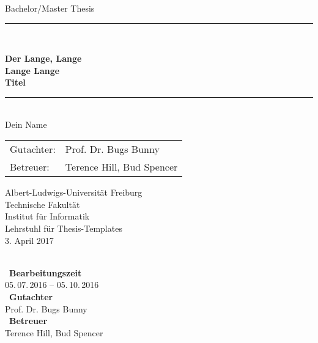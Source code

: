 \begin{titlepage}
\begin{center}

\newcommand{\HorizontalLine}{\rule{\linewidth}{0.3mm}}

{\Large Bachelor/Master Thesis}\\[1.3cm]


\HorizontalLine \\[0.4cm]
\begin{spacing}{3}
    {\huge \bfseries Der Lange, Lange } \\
    {\huge \bfseries Lange Lange} \\
    {\huge \bfseries Titel}\\
\end{spacing}
\HorizontalLine \\[1.5cm]


{\Huge Dein Name} \\[2cm]


\begin{tabular}[hc]{>{\huge}l >{\huge}l}
  Gutachter: & Prof. Dr. Bugs Bunny \\[0.3cm]
  Betreuer: & Terence Hill, Bud Spencer \\[1.2cm]
\end{tabular}
\vfill  %

\Large {
    Albert-Ludwigs-Universität Freiburg\\
    Technische Fakultät\\
    Institut für Informatik\\
    Lehrstuhl für Thesis-Templates\\[1cm]

    3. April 2017
    \\
}
\end{center}
\end{titlepage}

\ \vfill \ \\  %
\
\textbf{Bearbeitungszeit}            \smallskip{} \\
05.\,07.\,2016 -- 05.\,10.\,2016   \bigskip{} \\
\
\textbf{Gutachter}                  \smallskip{} \\
Prof. Dr. Bugs Bunny               \bigskip{} \\
\
\textbf{Betreuer}                  \smallskip{} \\
Terence Hill, Bud Spencer
